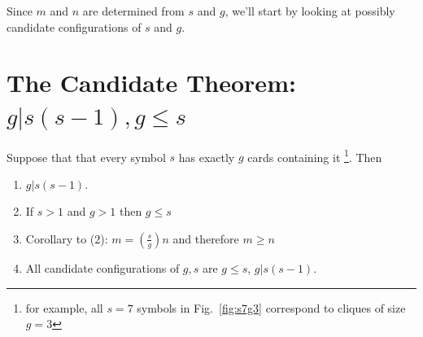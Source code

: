 \documentclass[11pt, oneside]{article} 	%
\begin{document}
Since $m$ and $n$ are determined from $s$ and $g$, we'll start by looking at possibly candidate configurations of $s$ and $g$.

\section{The Candidate Theorem: $g | s(s-1), g \leq s$}

Suppose that that every symbol $s$ has exactly $g$ cards containing it \footnote{for example, all $s=7$ symbols in Fig.~\ref{fig:s7g3} correspond to cliques of size $g=3$}.  Then 

\begin{framed}
\begin{enumerate}
\item $g | s(s-1)$.
\item If $s >1 $ and $g > 1$ then $g \leq s$ 
\item Corollary to (2): $m = (\frac{s}{g})n$ and therefore $m \geq n$
\item All candidate configurations of $g, s$ are $g \leq s$, $g | s(s-1)$.
\end{enumerate}
\end{framed}
\end{document}
